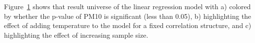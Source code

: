 \documentclass[
]{jds}
\begin{document}
\label{cell-fig-result-universe}
\begin{figure}[H]


\caption{\label{fig-result-universe}}

\end{figure}%

Figure~\ref{fig-result-universe} shows that result universe of the
linear regression model with a) colored by whether the p-value of PM10
is significant (less than 0.05), b) highlighting the effect of adding
temperature to the model for a fixed correlation structure, and c)
highlighting the effect of increasing sample size.
\end{document}
